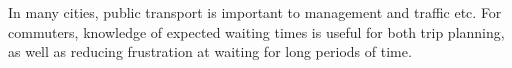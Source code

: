 \documentclass[12pt,a4paper]{article}
\begin{document}
















In many cities, public transport is important to management and traffic etc.
For commuters, knowledge of expected waiting times is useful for both trip planning,
as well as reducing frustration at waiting for long periods of time.
\end{document}
